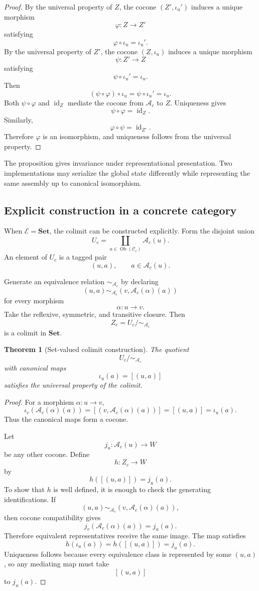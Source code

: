 \documentclass[11pt]{article}
\newtheorem{theorem}[definition]{Theorem}
\theoremstyle{definition}
\DeclareMathOperator{\Ob}{Ob}
\newcommand{\C}{\mathcal{C}}
\newcommand{\A}{\mathcal{A}}
\begin{document}
\begin{proof}
By the universal property of \(Z\), the cocone \((Z',\iota_u')\) induces a unique morphism
\[
\varphi:Z\to Z'
\]
satisfying
\[
\varphi\circ\iota_u=\iota_u'.
\]
By the universal property of \(Z'\), the cocone \((Z,\iota_u)\) induces a unique morphism
\[
\psi:Z'\to Z
\]
satisfying
\[
\psi\circ\iota_u'=\iota_u.
\]
Then
\[
(\psi\circ\varphi)\circ\iota_u
=
\psi\circ\iota_u'
=
\iota_u.
\]
Both \(\psi\circ\varphi\) and \(\operatorname{id}_Z\) mediate the cocone from \(\A_c\) to \(Z\). Uniqueness gives
\[
\psi\circ\varphi
=
\operatorname{id}_Z.
\]
Similarly,
\[
\varphi\circ\psi
=
\operatorname{id}_{Z'}.
\]
Therefore \(\varphi\) is an isomorphism, and uniqueness follows from the universal property.
\end{proof}

The proposition gives invariance under representational presentation. Two implementations may serialize the global state differently while representing the same assembly up to canonical isomorphism.

\subsection{Explicit construction in a concrete category}

When \(\mathscr E=\mathbf{Set}\), the colimit can be constructed explicitly. Form the disjoint union
\[
U_c
=
\coprod_{u\in\Ob(\C_c)}
\A_c(u).
\]
An element of \(U_c\) is a tagged pair
\[
(u,a),
\qquad
a\in\A_c(u).
\]

Generate an equivalence relation \(\sim_{\A_c}\) by declaring
\[
(u,a)
\sim_{\A_c}
\left(
v,\A_c(\alpha)(a)
\right)
\]
for every morphism
\[
\alpha:u\to v.
\]
Take the reflexive, symmetric, and transitive closure. Then
\[
Z_c
=
U_c/{\sim_{\A_c}}
\]
is a colimit in \(\mathbf{Set}\).

\begin{theorem}[Set-valued colimit construction]
The quotient
\[
U_c/{\sim_{\A_c}}
\]
with canonical maps
\[
\iota_u(a)=[(u,a)]
\]
satisfies the universal property of the colimit.
\end{theorem}

\begin{proof}
For a morphism \(\alpha:u\to v\),
\[
\iota_v(\A_c(\alpha)(a))
=
[(v,\A_c(\alpha)(a))]
=
[(u,a)]
=
\iota_u(a).
\]
Thus the canonical maps form a cocone.

Let
\[
j_u:\A_c(u)\to W
\]
be any other cocone. Define
\[
h:Z_c\to W
\]
by
\[
h([(u,a)])=j_u(a).
\]
To show that \(h\) is well defined, it is enough to check the generating identifications. If
\[
(u,a)
\sim_{\A_c}
(v,\A_c(\alpha)(a)),
\]
then cocone compatibility gives
\[
j_v(\A_c(\alpha)(a))
=
j_u(a).
\]
Therefore equivalent representatives receive the same image. The map satisfies
\[
h(\iota_u(a))
=
h([(u,a)])
=
j_u(a).
\]
Uniqueness follows because every equivalence class is represented by some \((u,a)\), so any mediating map must take
\[
[(u,a)]
\]
to \(j_u(a)\).
\end{proof}
\end{document}
